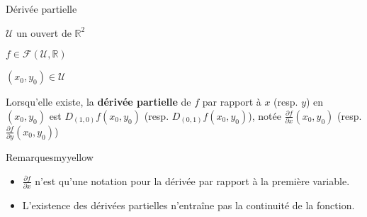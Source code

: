     \begin{defi}{Dérivée partielle}{}
        \begin{soient}
            \item $\mathcal{U}$ un ouvert de $\mathbb{R}^2$
            \item $f \in \mathcal{F}(\mathcal{U},\mathbb{R})$
            \item $(x_0,y_0) \in \mathcal{U}$
        \end{soient}
        Lorsqu’elle existe, la \textbf{dérivée partielle} de $f$ par rapport à $x$ (resp. $y$) en $(x_0,y_0)$ est $D_{(1,0)}f(x_0,y_0)$ (resp. $D_{(0,1)}f(x_0,y_0)$), notée $\frac{\partial f}{\partial x}(x_0,y_0)$ (resp. $\frac{\partial f}{\partial y}(x_0,y_0)$)
    \end{defi}

    \begin{omed}{Remarques}{myyellow}
        \begin{itemize}
            \item $\frac{\partial f}{\partial x}$ n’est qu’une notation pour la dérivée par rapport à la première variable.
            \item L’existence des dérivées partielles n’entraîne pas la continuité de la fonction.
        \end{itemize}
    \end{omed}

